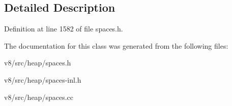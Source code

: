 \subsection{Detailed Description}


Definition at line 1582 of file spaces.\+h.



The documentation for this class was generated from the following files\+:\begin{DoxyCompactItemize}
\item 
v8/src/heap/spaces.\+h\item 
v8/src/heap/spaces-\/inl.\+h\item 
v8/src/heap/spaces.\+cc\end{DoxyCompactItemize}
